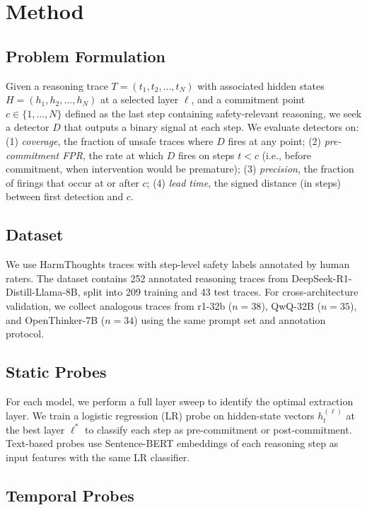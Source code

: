 \documentclass[11pt,a4paper]{article}
\begin{document}
\section{Method}

\subsection{Problem Formulation}

Given a reasoning trace $T = (t_1, t_2, \ldots, t_N)$ with associated hidden states $H = (h_1, h_2, \ldots, h_N)$ at a selected layer $\ell$, and a commitment point $c \in \{1, \ldots, N\}$ defined as the last step containing safety-relevant reasoning, we seek a detector $D$ that outputs a binary signal at each step. We evaluate detectors on: (1) \emph{coverage}, the fraction of unsafe traces where $D$ fires at any point; (2) \emph{pre-commitment FPR}, the rate at which $D$ fires on steps $t < c$ (i.e., before commitment, when intervention would be premature); (3) \emph{precision}, the fraction of firings that occur at or after $c$; (4) \emph{lead time}, the signed distance (in steps) between first detection and $c$.

\subsection{Dataset}

We use HarmThoughts traces with step-level safety labels annotated by human raters. The dataset contains 252 annotated reasoning traces from DeepSeek-R1-Distill-Llama-8B, split into 209 training and 43 test traces. For cross-architecture validation, we collect analogous traces from r1-32b ($n=38$), QwQ-32B ($n=35$), and OpenThinker-7B ($n=34$) using the same prompt set and annotation protocol.

\subsection{Static Probes}

For each model, we perform a full layer sweep to identify the optimal extraction layer. We train a logistic regression (LR) probe on hidden-state vectors $h_t^{(\ell)}$ at the best layer $\ell^*$ to classify each step as pre-commitment or post-commitment. Text-based probes use Sentence-BERT embeddings of each reasoning step as input features with the same LR classifier.

\subsection{Temporal Probes}
\end{document}
